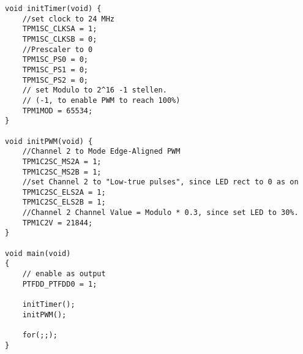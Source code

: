 \begin{lstlisting}
void initTimer(void) {
    //set clock to 24 MHz
    TPM1SC_CLKSA = 1;
    TPM1SC_CLKSB = 0;
    //Prescaler to 0
    TPM1SC_PS0 = 0;
    TPM1SC_PS1 = 0;
    TPM1SC_PS2 = 0;
    // set Modulo to 2^16 -1 stellen.
    // (-1, to enable PWM to reach 100%)
    TPM1MOD = 65534;
}

void initPWM(void) {
    //Channel 2 to Mode Edge-Aligned PWM
    TPM1C2SC_MS2A = 1;
    TPM1C2SC_MS2B = 1;
    //set Channel 2 to "Low-true pulses", since LED rect to 0 as on
    TPM1C2SC_ELS2A = 1;
    TPM1C2SC_ELS2B = 1;
    //Channel 2 Channel Value = Modulo * 0.3, since set LED to 30%.
    TPM1C2V = 21844;
}

void main(void)
{
    // enable as output
    PTFDD_PTFDD0 = 1;

    initTimer();
    initPWM();

    for(;;);
}
\end{lstlisting}
